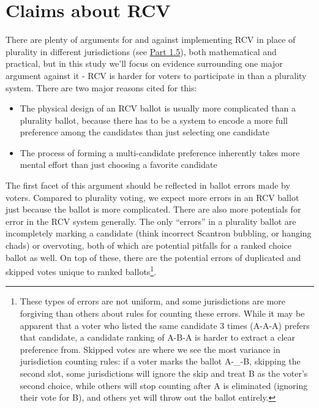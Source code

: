 \documentclass[12pt,twoside]{reedthesis}
\begin{document}
\hypertarget{claims-about-rcv}{%
\section{Claims about RCV}\label{claims-about-rcv}}

There are plenty of arguments for and against implementing RCV in place of plurality in different jurisdictions (see \protect\hyperlink{rcv-args}{Part 1.5}), both mathematical and practical, but in this study we'll focus on evidence surrounding one major argument against it - RCV is harder for voters to participate in than a plurality system. There are two major reasons cited for this:
\begin{itemize}
\item
  The physical design of an RCV ballot is usually more complicated than a plurality ballot, because there has to be a system to encode a more full preference among the candidates than just selecting one candidate
\item
  The process of forming a multi-candidate preference inherently takes more mental effort than just choosing a favorite candidate
\end{itemize}
The first facet of this argument should be reflected in ballot errors made by voters. Compared to plurality voting, we expect more errors in an RCV ballot just because the ballot is more complicated. There are also more potentials for error in the RCV system generally. The only ``errors'' in a plurality ballot are incompletely marking a candidate (think incorrect Scantron bubbling, or hanging chads) or overvoting, both of which are potential pitfalls for a ranked choice ballot as well. On top of these, there are the potential errors of duplicated and skipped votes unique to ranked ballots\footnote{These types of errors are not uniform, and some jurisdictions are more forgiving than others about rules for counting these errors. While it may be apparent that a voter who listed the same candidate 3 times (A-A-A) prefers that candidate, a candidate ranking of A-B-A is harder to extract a clear preference from. Skipped votes are where we see the most variance in jurisdiction counting rules: if a voter marks the ballot A-\_-B, skipping the second slot, some jurisdictions will ignore the skip and treat B as the voter's second choice, while others will stop counting after A is eliminated (ignoring their vote for B), and others yet will throw out the ballot entirely.}.
\end{document}
